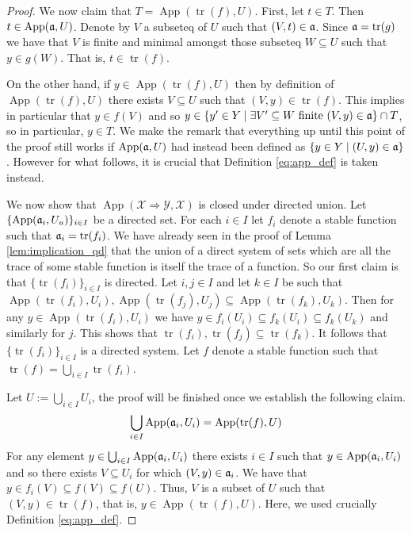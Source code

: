 \documentclass[12pt]{article}
\theoremstyle{plain}
\theoremstyle{definition}
\newcommand{\scr}[1]{\mathscr{#1}}
\begin{document}
\begin{proof}
		We now claim that $T = \operatorname{App}(\operatorname{tr}(f), U)$. First, let $t \in T$. Then $t \in \operatorname{App}(\frak{a}, U)$. Denote by $V$ a subseteq of $U$ such that $(V, t) \in \frak{a}$. Since $\frak{a} = \operatorname{tr}(g)$ we have that $V$ is finite and minimal amongst those subseteq $W \subseteq U$ such that $y \in g(W)$. That is, $t \in \operatorname{tr}(f)$.
		
		On the other hand, if $y \in \operatorname{App}(\operatorname{tr}(f), U)$ then by definition of $\operatorname{App}(\operatorname{tr}(f), U)$ there exists $V \subseteq U$ such that $(V, y) \in \operatorname{tr}(f)$. This implies in particular that $y \in f(V)$ and so $y \in \{ y' \in Y \mid \exists V' \subseteq W \text{ finite }(V,y) \in \frak{a} \} \cap T$, so in particular, $y \in T$. We make the remark that everything up until this point of the proof still works if $\operatorname{App}(\frak{a},U)$ had instead been defined as $\{ y \in Y \mid (U, y) \in \frak{a} \}$. However for what follows, it is crucial that Definition \eqref{eq:app_def} is taken instead.
		
		We now show that $\operatorname{App}(\scr{X} \Rightarrow \scr{Y}, \scr{X})$ is closed under directed union. Let $\{ \operatorname{App}(\frak{a}_i, U_u) \}_{i \in I}$ be a directed set. For each $i \in I$ let $f_i$ denote a stable function such that $\frak{a}_i = \operatorname{tr}(f_i)$. We have already seen in the proof of Lemma \ref{lem:implication_qd} that the union of a direct system of sets which are all the trace of some stable function is itself the trace of a function. So our first claim is that $\{ \operatorname{tr}(f_i) \}_{i \in I}$ is directed. Let $i,j \in I$ and let $k \in I$ be such that $\operatorname{App}(\operatorname{tr}(f_i), U_i), \operatorname{App}(\operatorname{tr}(f_j), U_j) \subseteq \operatorname{App}(\operatorname{tr}(f_k), U_k)$. Then for any $y \in \operatorname{App}(\operatorname{tr}(f_i), U_i)$ we have $y \in f_i(U_i) \subseteq f_k(U_i) \subseteq f_k(U_k)$ and similarly for $j$. This shows that $\operatorname{tr}(f_i), \operatorname{tr}(f_j) \subseteq \operatorname{tr}(f_k)$. It follows that $\{ \operatorname{tr}(f_i) \}_{i \in I}$ is a directed system. Let $f$ denote a stable function such that $\operatorname{tr}(f) = \bigcup_{i \in I}\operatorname{tr}(f_i)$.
		
		Let $U := \bigcup_{i \in I}U_i$, the proof will be finished once we establish the following claim.
		\begin{equation}
			\bigcup_{i \in I}\operatorname{App}(\frak{a}_i, U_i) = \operatorname{App}(\operatorname{tr}(f), U)
			\end{equation}
		For any element $y \in \bigcup_{i \in I}\operatorname{App}(\frak{a}_i, U_i)$ there exists $i \in I$ such that $y \in \operatorname{App}(\frak{a}_i, U_i)$ and so there exists $V \subseteq U_i$ for which $(V, y) \in \frak{a}_i$. We have that $y \in f_i(V) \subseteq f(V) \subseteq f(U)$. Thus, $V$ is a subset of $U$ such that $(V, y) \in \operatorname{tr}(f)$, that is, $y \in \operatorname{App}(\operatorname{tr}(f), U)$. Here, we used crucially Definition \eqref{eq:app_def}.
		

\end{proof}
\end{document}
